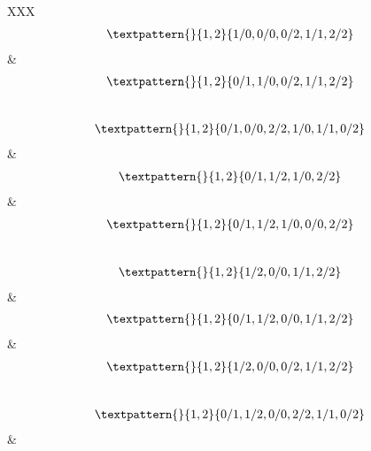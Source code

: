 \begin{center}
\begin{longtabu}[l]{XXX}
\begin{equation}
\begin{gathered}
		\textpattern{}{1,2}{1/0,0/0,0/2,1/1,2/2}
	\end{gathered}
	\label{cls:99}
\end{equation}
&
\begin{equation}
	\begin{gathered}
		\textpattern{}{1,2}{0/1,1/0,0/2,1/1,2/2}
	\end{gathered}
	\label{cls:100}
\end{equation}
\\
\begin{equation}
	\begin{gathered}
		\textpattern{}{1,2}{0/1,0/0,2/2,1/0,1/1,0/2}
	\end{gathered}
	\label{cls:101}
\end{equation}
&
\begin{equation}
	\begin{gathered}
		\textpattern{}{1,2}{0/1,1/2,1/0,2/2}
	\end{gathered}
	\label{cls:102}
\end{equation}
&
\begin{equation}
	\begin{gathered}
		\textpattern{}{1,2}{0/1,1/2,1/0,0/0,2/2}
	\end{gathered}
	\label{cls:103}
\end{equation}
\\
\begin{equation}
	\begin{gathered}
		\textpattern{}{1,2}{1/2,0/0,1/1,2/2}
	\end{gathered}
	\label{cls:104}
\end{equation}
&
\begin{equation}
	\begin{gathered}
		\textpattern{}{1,2}{0/1,1/2,0/0,1/1,2/2}
	\end{gathered}
	\label{cls:105}
\end{equation}
&
\begin{equation}
	\begin{gathered}
		\textpattern{}{1,2}{1/2,0/0,0/2,1/1,2/2}
	\end{gathered}
	\label{cls:106}
\end{equation}
\\
\begin{equation}
	\begin{gathered}
		\textpattern{}{1,2}{0/1,1/2,0/0,2/2,1/1,0/2}
	\end{gathered}
	\label{cls:107}
\end{equation}
&
\begin{equation}

\end{equation}
\end{longtabu}
\end{center}
